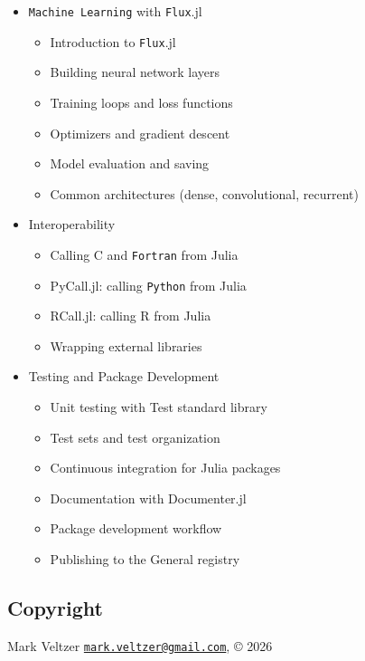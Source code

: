 \documentclass[
]{article}
\providecommand{\tightlist}{%
  \setlength{\itemsep}{0pt}\setlength{\parskip}{0pt}}
\begin{document}
\begin{itemize}
  \begin{itemize}
  \tightlist
  \item
    Plots.jl: basic and advanced plotting
  \item
    Plot backends and customization
  \item
    Makie.jl for interactive and publication-quality graphics
  \item
    Statistical visualizations
  \end{itemize}
\item
  \texttt{Machine\ Learning} with \texttt{Flux}.jl

  \begin{itemize}
  \tightlist
  \item
    Introduction to \texttt{Flux}.jl
  \item
    Building neural network layers
  \item
    Training loops and loss functions
  \item
    Optimizers and gradient descent
  \item
    Model evaluation and saving
  \item
    Common architectures (dense, convolutional, recurrent)
  \end{itemize}
\item
  Interoperability

  \begin{itemize}
  \tightlist
  \item
    Calling C and \texttt{Fortran} from Julia
  \item
    PyCall.jl: calling \texttt{Python} from Julia
  \item
    RCall.jl: calling R from Julia
  \item
    Wrapping external libraries
  \end{itemize}
\item
  Testing and Package Development

  \begin{itemize}
  \tightlist
  \item
    Unit testing with Test standard library
  \item
    Test sets and test organization
  \item
    Continuous integration for Julia packages
  \item
    Documentation with Documenter.jl
  \item
    Package development workflow
  \item
    Publishing to the General registry
  \end{itemize}
\end{itemize}

\subsection{Copyright}\label{copyright}

Mark Veltzer
\href{mailto:mark.veltzer@gmail.com}{\nolinkurl{mark.veltzer@gmail.com}},
© 2026
\end{document}
